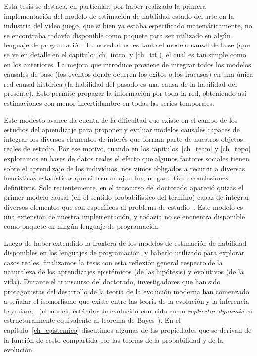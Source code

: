 \documentclass[a4paper,11pt]{book}
\theoremstyle{definition}
\begin{document}
Esta tesis se destaca, en particular, por haber realizado la primera implementaci\'on del modelo de estimaci\'on de habilidad estado del arte en la industria del video juego, que si bien ya estaba especificado matem\'aticamente, no se encontraba todav\'ia disponible como paquete para ser utilizado en alg\'un lenguaje de programaci\'on.
%
La novedad no es tanto el modelo causal de base (que se ve en detalle en el cap\'itulo~\ref{ch_intro} y \ref{ch_ttt}), el cual es tan simple como en los anteriores.
%
La mejora que introduce proviene de integrar todos los modelos causales de base (los eventos donde ocurren los \'exitos o los fracasos) en una \'unica red causal hist\'orica (la habilidad del pasado es una causa de la habilidad del presente).
%
Esto permite propagar la informaci\'on por toda la red, obteniendo as\'i estimaciones con menor incertidumbre en todas las series temporales.


Este modesto avance da cuenta de la dificultad que existe en el campo de los estudios del aprendizaje para proponer y evaluar modelos causales capaces de integrar los diversos elementos de inter\'es que forman parte de nuestros objetos reales de estudio.
%
Por ese motivo, cuando en los cap\'itulos~\ref{ch_team} y \ref{ch_topo} exploramos en bases de datos reales el efecto que algunos factores sociales tienen sobre el aprendizaje de los individuos, nos vimos obligados a recurrir a diversas heur\'isticas estad\'isticas que si bien arrojan luz, no garantizan conclusiones definitivas.
%
Solo recientemente, en el trascurso del doctorado apareci\'o quiz\'as el primer modelo causal (en el sentido probabil\'istico del t\'ermino) capaz de integrar diversos elementos que son espec\'ificos al problema de estudio~\cite{minka2018-trueskill2}.
%
Este modelo es una extensi\'on de nuestra implementaci\'on, y todav\'ia no se encuentra disponible como paquete en ning\'un lenguaje de programaci\'on.


Luego de haber extendido la frontera de los modelos de estimaci\'on de habilidad disponibles en los lenguajes de programaci\'on, y haberlo utilizado para explorar casos reales, finalizamos la tesis con esta reflexi\'on general respecto de la naturaleza de los aprendizajes epist\'emicos (de las hip\'otesis) y evolutivos (de la vida).
%
Durante el transcurso del doctorado, investigadores que han sido protagonistas del desarrollo de la teor\'ia de la evoluci\'on moderna han comenzado a se\~nalar el isomorfismo que existe entre las teor\'ia de la evoluci\'on y la inferencia bayesiana~\cite{czegel2019-bayesianEvolution, czegel2022-bayesDarwin} (el modelo est\'andar de evoluci\'on conocido como \emph{replicator dynamic} \cite{taylor1978-replicatorDynamic} es estructuralmente equivalente al teorema de Bayes~\cite{harper2009-replicatorAsInference,shalizi2009-replicatorAsInference}).
%
En el cap\'itulo~\ref{ch_epistemico} discutimos algunas de las propiedades que se derivan de la funci\'on de costo compartida por las teor\'ias de la probabilidad y de la evoluci\'on.
\end{document}
